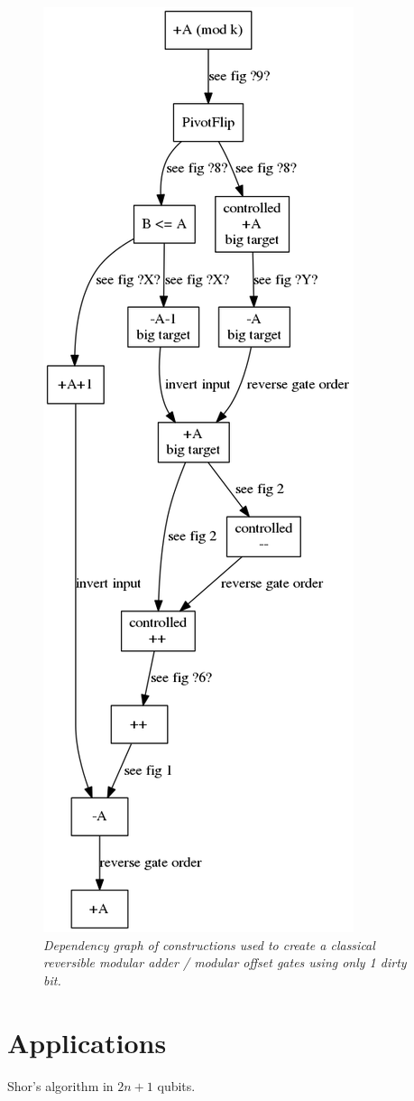 \documentclass[twocolumn]{article}
\begin{document}
\begin{figure}
  \centering
  \includegraphics[totalheight=18cm]{modular-add-graph.png}
  \caption{\em
      Dependency graph of constructions used to create a classical reversible modular adder / modular offset gates using only 1 dirty bit.}
  \label{fig:modular-dependencies}
\end{figure}


\section{Applications}

Shor's algorithm in $2n+1$ qubits.



\end{document}
